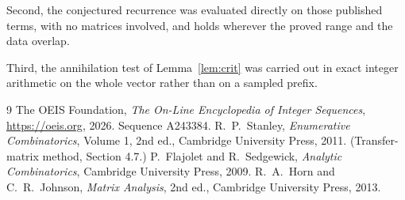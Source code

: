 \documentclass[11pt,a4paper]{article}
\theoremstyle{plain}
\theoremstyle{definition}
\begin{document}
Second, the conjectured recurrence was evaluated directly on those published terms, with no
matrices involved, and holds wherever the proved range and the data overlap.

Third, the annihilation test of Lemma~\ref{lem:crit} was carried out in exact integer
arithmetic on the whole vector rather than on a sampled prefix.

\begin{thebibliography}{9}
 The OEIS Foundation, \emph{The On-Line Encyclopedia of Integer
Sequences}, \url{https://oeis.org}, 2026. Sequence A243384.
 R.~P.~Stanley, \emph{Enumerative Combinatorics}, Volume 1, 2nd ed.,
Cambridge University Press, 2011. (Transfer-matrix method, Section 4.7.)
 P.~Flajolet and R.~Sedgewick, \emph{Analytic Combinatorics}, Cambridge
University Press, 2009.
 R.~A.~Horn and C.~R.~Johnson, \emph{Matrix Analysis}, 2nd ed., Cambridge
University Press, 2013.
\end{thebibliography}
\end{document}
